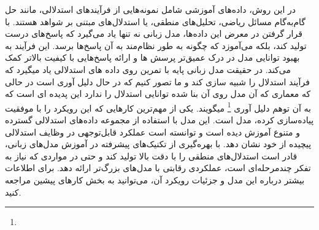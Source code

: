 در این روش، داده‌های آموزشی شامل نمونه‌هایی از فرآیندهای استدلالی، مانند حل گام‌به‌گام مسائل ریاضی، تحلیل‌های منطقی، یا استدلال‌های مبتنی بر شواهد هستند. با قرار گرفتن در معرض این داده‌ها، مدل زبانی نه تنها یاد می‌گیرد که پاسخ‌های درست تولید کند، بلکه می‌آموزد که چگونه به طور نظام‌مند به آن پاسخ‌ها برسد. این فرآیند به بهبود توانایی مدل در درک عمیق‌تر پرسش ها و ارائه پاسخ‌هایی با کیفیت بالاتر کمک می‌کند. در حقیقت مدل زبانی پایه با تمرین روی داده های استدلالی یاد میگیرد که فرآیند استدلال را شبیه سازی کند و ما تصور کنیم که در حال دلیل آوری است در حالی که معماری که آن مدل روی آن بنا شده توانایی استدلال را ندارد این پدیده ای است که به آن توهم دلیل آوری
\footnote{}
میگویند.
\cite{b34}
\cite{b35}
یکی از مهم‌ترین کارهایی که این رویکرد را با موفقیت پیاده‌سازی کرده، مدل
\cite{b36}
است. این مدل با استفاده از مجموعه داده‌های استدلالی گسترده و متنوع آموزش دیده است و توانسته است عملکرد قابل‌توجهی در وظایف استدلالی پیچیده از خود نشان دهد.
با بهره‌گیری از تکنیک‌های پیشرفته در آموزش مدل‌های زبانی، قادر است استدلال‌های منطقی را با دقت بالا تولید کند و حتی در مواردی که نیاز به تفکر چندمرحله‌ای است، عملکردی رقابتی با مدل‌های بزرگ‌تر ارائه دهد. برای اطلاعات بیشتر درباره این مدل و جزئیات رویکرد آن، می‌توانید به بخش کارهای پیشین مراجعه کنید.
